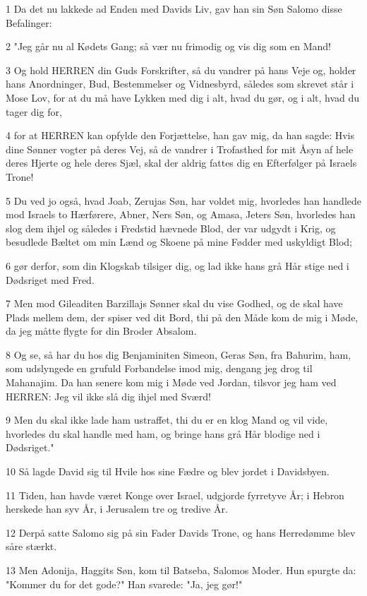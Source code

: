 \par 1 Da det nu lakkede ad Enden med Davids Liv, gav han sin Søn Salomo disse Befalinger:
\par 2 "Jeg går nu al Kødets Gang; så vær nu frimodig og vis dig som en Mand!
\par 3 Og hold HERREN din Guds Forskrifter, så du vandrer på hans Veje og, holder hans Anordninger, Bud, Bestemmelser og Vidnesbyrd, således som skrevet står i Mose Lov, for at du må have Lykken med dig i alt, hvad du gør, og i alt, hvad du tager dig for,
\par 4 for at HERREN kan opfylde den Forjættelse, han gav mig, da han sagde: Hvis dine Sønner vogter på deres Vej, så de vandrer i Trofasthed for mit Åsyn af hele deres Hjerte og hele deres Sjæl, skal der aldrig fattes dig en Efterfølger på Israels Trone!
\par 5 Du ved jo også, hvad Joab, Zerujas Søn, har voldet mig, hvorledes han handlede mod Israels to Hærførere, Abner, Ners Søn, og Amasa, Jeters Søn, hvorledes han slog dem ihjel og således i Fredstid hævnede Blod, der var udgydt i Krig, og besudlede Bæltet om min Lænd og Skoene på mine Fødder med uskyldigt Blod;
\par 6 gør derfor, som din Klogskab tilsiger dig, og lad ikke hans grå Hår stige ned i Dødsriget med Fred.
\par 7 Men mod Gileaditen Barzillajs Sønner skal du vise Godhed, og de skal have Plads mellem dem, der spiser ved dit Bord, thi på den Måde kom de mig i Møde, da jeg måtte flygte for din Broder Absalom.
\par 8 Og se, så har du hos dig Benjaminiten Simeon, Geras Søn, fra Bahurim, ham, som udslyngede en grufuld Forbandelse imod mig, dengang jeg drog til Mahanajim. Da han senere kom mig i Møde ved Jordan, tilsvor jeg ham ved HERREN: Jeg vil ikke slå dig ihjel med Sværd!
\par 9 Men du skal ikke lade ham ustraffet, thi du er en klog Mand og vil vide, hvorledes du skal handle med ham, og bringe hans grå Hår blodige ned i Dødsriget."
\par 10 Så lagde David sig til Hvile hos sine Fædre og blev jordet i Davidsbyen.
\par 11 Tiden, han havde været Konge over Israel, udgjorde fyrretyve År; i Hebron herskede han syv År, i Jerusalem tre og tredive År.
\par 12 Derpå satte Salomo sig på sin Fader Davids Trone, og hans Herredømme blev såre stærkt.
\par 13 Men Adonija, Haggits Søn, kom til Batseba, Salomos Moder. Hun spurgte da: "Kommer du for det gode?" Han svarede: "Ja, jeg gør!"
